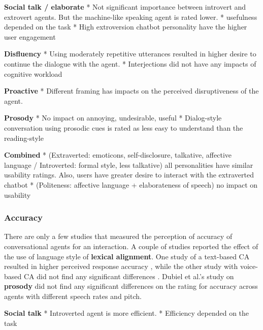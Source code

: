 \documentclass[sigconf,screen,review, anonymous]{acmart}
\newcommand{\cmt}[1]{}%
\begin{document}
\textbf{Social talk / elaborate}
* Not significant importance between introvert and extrovert agents. But the machine-like speaking agent is rated lower. \cite{roy2021users}\cmt{[71]}
* usefulness depended on the task \cite{haas2022keep}\cmt{[78]}
* High extroversion chatbot personality have the higher user engagement \cite{moilanen2022measuring}\cmt{[82]}

\textbf{Disfluency}
* Using moderately repetitive utterances resulted in higher desire to continue the dialogue with the agent. \cite{yang2021effect}\cmt{[72]}
* Interjections did not have any impacts of cognitive workload \cite{ceha2022expressive}\cmt{[77]}

\textbf{Proactive}
* Different framing has impacts on the perceived disruptiveness of the agent. \cite{xiao2021let}\cmt{[73]}

\textbf{Prosody}
* No impact on annoying, undesirable, useful \cite{jestin2022effects}\cmt{[81]}
* Dialog-style conversation using prosodic cues is rated as less easy to understand than the reading-style \cite{misu2011toward}\cmt{[83]}

\textbf{Combined}
* (Extraverted: emoticons, self-disclosure, talkative, affective language / Introverted: formal style, less talkative) all personalities have similar usability ratings. Also, users have greater desire to interact with the extraverted chatbot \cite{volkel2022user}\cmt{[75]}
* (Politeness: affective language + elaborateness of speech) no impact on usability \cite{hu2022polite}\cmt{[76]}


\subsubsection{Accuracy}
There are only a few studies that measured the perception of accuracy of conversational agents for an interaction. A couple of studies reported the effect of the use of language style of \textbf{lexical alignment}. One study of a text-based CA resulted in higher perceived response accuracy \cite{huiyang2022improving}\cmt{[17]}, while the other study with voice-based CA did not find any significant differences \cite{linnemann2018can}\cmt{[15]}. Dubiel et al.'s study \cite{dubiel2020persuasive}\cmt{[60]} on \textbf{prosody} did not find any significant differences on the rating for accuracy across agents with different speech rates and pitch.

\textbf{Social talk}
* Introverted agent is more efficient. \cite{roy2021users}\cmt{[71]}
* Efficiency depended on the task \cite{haas2022keep}\cmt{[78]}
\end{document}
